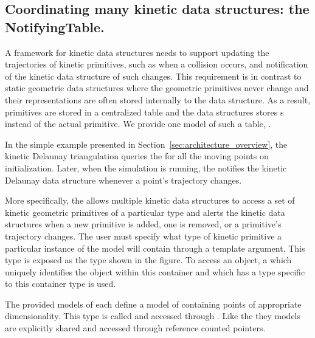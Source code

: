 \subsection{Coordinating many kinetic data structures: the NotifyingTable.}
\label{sec:moving_object_table}

A framework for kinetic data structures needs to support updating the
trajectories of kinetic primitives, such as when a collision occurs,
and notification of the kinetic data structure of such changes. This
requirement is in contrast to static geometric data structures where
the geometric primitives never change and their representations are
often stored internally to the data structure. As a result, primitives
are stored in a centralized table and the data structures stores
s instead of the actual primitive. We provide one model of
such a table, .

In the simple example presented in
Section~\ref{sec:architecture_overview}, the kinetic Delaunay
triangulation queries the  for all the moving points on
initialization. Later, when the simulation is running, the
 notifies the kinetic Delaunay data structure whenever a point's
trajectory changes.

More specifically, the  allows multiple kinetic
data structures to access a set of kinetic geometric primitives of a
particular type and alerts the kinetic data structures when a new
primitive is added, one is removed, or a primitive's trajectory
changes. The user must specify what type of kinetic primitive a
particular instance of the  model will contain
through a template argument. This type is exposed as the 
type shown in the figure. To access an object, a  which
uniquely identifies the object within this container and which has a
type specific to this container type is used.

The provided models of  each define a model of
 containing points of appropriate
dimensionality. This type is called
 and accessed through
. Like the
 they  models are explicitly shared
and accessed through reference counted pointers.


